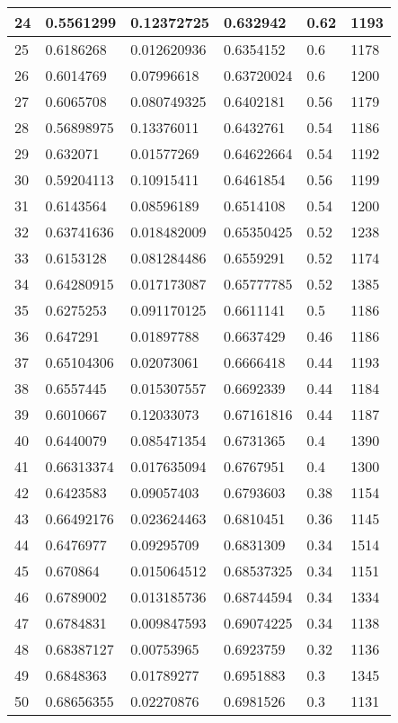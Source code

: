 \begin{longtable}{|l|l|l|l|l|l|}
24 & 0.5561299 & 0.12372725 & 0.632942 & 0.62 & 1193 \\ \hline 
25 & 0.6186268 & 0.012620936 & 0.6354152 & 0.6 & 1178 \\ \hline 
26 & 0.6014769 & 0.07996618 & 0.63720024 & 0.6 & 1200 \\ \hline 
27 & 0.6065708 & 0.080749325 & 0.6402181 & 0.56 & 1179 \\ \hline 
28 & 0.56898975 & 0.13376011 & 0.6432761 & 0.54 & 1186 \\ \hline 
29 & 0.632071 & 0.01577269 & 0.64622664 & 0.54 & 1192 \\ \hline 
30 & 0.59204113 & 0.10915411 & 0.6461854 & 0.56 & 1199 \\ \hline 
31 & 0.6143564 & 0.08596189 & 0.6514108 & 0.54 & 1200 \\ \hline 
32 & 0.63741636 & 0.018482009 & 0.65350425 & 0.52 & 1238 \\ \hline 
33 & 0.6153128 & 0.081284486 & 0.6559291 & 0.52 & 1174 \\ \hline 
34 & 0.64280915 & 0.017173087 & 0.65777785 & 0.52 & 1385 \\ \hline 
35 & 0.6275253 & 0.091170125 & 0.6611141 & 0.5 & 1186 \\ \hline 
36 & 0.647291 & 0.01897788 & 0.6637429 & 0.46 & 1186 \\ \hline 
37 & 0.65104306 & 0.02073061 & 0.6666418 & 0.44 & 1193 \\ \hline 
38 & 0.6557445 & 0.015307557 & 0.6692339 & 0.44 & 1184 \\ \hline 
39 & 0.6010667 & 0.12033073 & 0.67161816 & 0.44 & 1187 \\ \hline 
40 & 0.6440079 & 0.085471354 & 0.6731365 & 0.4 & 1390 \\ \hline 
41 & 0.66313374 & 0.017635094 & 0.6767951 & 0.4 & 1300 \\ \hline 
42 & 0.6423583 & 0.09057403 & 0.6793603 & 0.38 & 1154 \\ \hline 
43 & 0.66492176 & 0.023624463 & 0.6810451 & 0.36 & 1145 \\ \hline 
44 & 0.6476977 & 0.09295709 & 0.6831309 & 0.34 & 1514 \\ \hline 
45 & 0.670864 & 0.015064512 & 0.68537325 & 0.34 & 1151 \\ \hline 
46 & 0.6789002 & 0.013185736 & 0.68744594 & 0.34 & 1334 \\ \hline 
47 & 0.6784831 & 0.009847593 & 0.69074225 & 0.34 & 1138 \\ \hline 
48 & 0.68387127 & 0.00753965 & 0.6923759 & 0.32 & 1136 \\ \hline 
49 & 0.6848363 & 0.01789277 & 0.6951883 & 0.3 & 1345 \\ \hline 
50 & 0.68656355 & 0.02270876 & 0.6981526 & 0.3 & 1131 \\ \hline 
\end{longtable}
